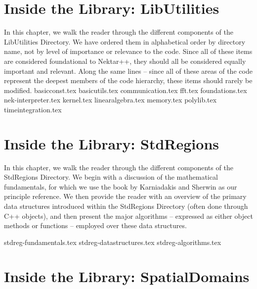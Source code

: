 
\chapter{Inside the Library: LibUtilities}

In this chapter, we walk the reader through the different components of the LibUtilities Directory.
We have ordered them in alphabetical order by directory name, not by level of importance or
relevance to the code.  Since all of these items are considered foundational to Nektar++, they
should all be considered equally important and relevant.   Along the same lines -- since all of
these areas of the code represent the deepest members of the code hierarchy, these
items should rarely be modified. 
%
{basicconst.tex}
%
{basicutils.tex}
%
{communication.tex}
%
{fft.tex}
%
{foundations.tex}
%
{nek-interpreter.tex}
%
{kernel.tex}
%
{linearalgebra.tex}
%
{memory.tex}
%
{polylib.tex}
%
{timeintegration.tex}

\chapter{Inside the Library: StdRegions}
\label{chap:stdregions}

In this chapter, we walk the reader through the different components of the StdRegions Directory.
We begin with a discussion of the mathematical fundamentals, for which we use the book
by Karniadakis and Sherwin \cite{KaSh05} as our principle reference.  We then provide
the reader with an overview of the primary data structures introduced within the
StdRegions Directory (often done through C++ objects), and then present the major 
algorithms -- expressed as either object methods or functions -- employed over these data structures.  

{stdreg-fundamentals.tex}
%
{stdreg-datastructures.tex}
%
{stdreg-algorithms.tex}


\chapter{Inside the Library: SpatialDomains}
\label{chap:spatialdomains}



